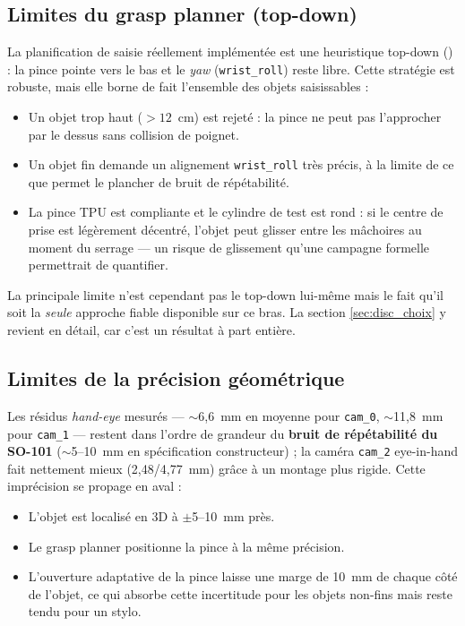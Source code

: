 \subsection{Limites du grasp planner (top-down)}

La planification de saisie réellement implémentée est une heuristique top-down
(\cite{bohg_data-driven_2014}) : la pince pointe vers le bas et le \emph{yaw}
(\texttt{wrist\_roll}) reste libre. Cette stratégie est robuste, mais elle borne
de fait l'ensemble des objets saisissables :
\begin{itemize}
  \item Un objet trop haut ($>12$~cm) est rejeté : la pince ne peut pas
        l'approcher par le dessus sans collision de poignet.
  \item Un objet fin demande un alignement \texttt{wrist\_roll} très précis, à la
        limite de ce que permet le plancher de bruit de répétabilité.
  \item La pince TPU est compliante et le cylindre de test est rond : si le centre
        de prise est légèrement décentré, l'objet peut glisser entre les mâchoires
        au moment du serrage --- un risque de glissement qu'une campagne formelle
        permettrait de quantifier.
\end{itemize}

La principale limite n'est cependant pas le top-down lui-même mais le fait qu'il
soit la \emph{seule} approche fiable disponible sur ce bras. La section
\ref{sec:disc_choix} y revient en détail, car c'est un résultat à part entière.

\subsection{Limites de la précision géométrique}

Les résidus \emph{hand-eye} mesurés --- $\sim$6{,}6~mm en moyenne pour
\texttt{cam\_0}, $\sim$11{,}8~mm pour \texttt{cam\_1} --- restent dans l'ordre de
grandeur du \textbf{bruit de répétabilité du SO-101}
($\sim$5--10~mm en spécification constructeur) ; la caméra \texttt{cam\_2}
eye-in-hand fait nettement mieux (2{,}48/4{,}77~mm) grâce à un montage plus rigide. Cette
imprécision se propage en aval :
\begin{itemize}
  \item L'objet est localisé en 3D à $\pm$5--10~mm près.
  \item Le grasp planner positionne la pince à la même précision.
  \item L'ouverture adaptative de la pince laisse une marge de 10~mm de chaque
        côté de l'objet, ce qui absorbe cette incertitude pour les objets
        non-fins mais reste tendu pour un stylo.
\end{itemize}

